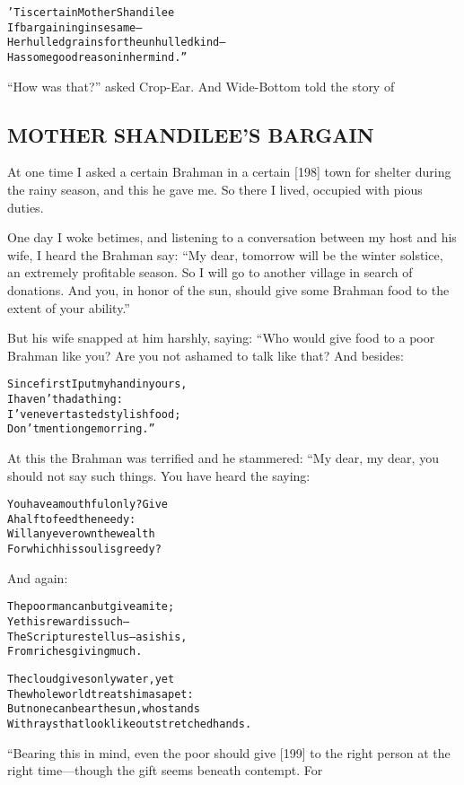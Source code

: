 \documentclass{article}
\renewenvironment{verbatim}{\begin{alltt}\normalfont\begin{centering}}{\end{centering}\end{alltt}}
\begin{document}
\begin{verbatim}
'Tis certain Mother Shandilee
If bargaining in sesame--
Her hulled grains for the unhulled kind--
Has some good reason in her mind.”
\end{verbatim}
``How was that?'' asked Crop-Ear. And Wide-Bottom told the story
of

\subsection{MOTHER SHANDILEE'S BARGAIN}

At one time I asked a certain Brahman in a certain [198] town for
shelter during the rainy season, and this he gave me. So there I
lived, occupied with pious duties.

One day I woke betimes, and listening to a conversation between my
host and his wife, I heard the Brahman say:
``My dear, tomorrow will be the winter solstice, an extremely profitable season. So I will go to another village in search of donations. And you, in honor of the sun, should give some Brahman food to the extent of your ability.''

But his wife snapped at him harshly, saying: “Who would give food
to a poor Brahman like you? Are you not ashamed to talk like that?
And besides:

\begin{verbatim}
Since first I put my hand in yours,
    I haven't had a thing:
I've never tasted stylish food;
    Don't mention gem or ring.”
\end{verbatim}
At this the Brahman was terrified and he stammered: “My dear, my
dear, you should not say such things. You have heard the saying:

\begin{verbatim}
You have a mouthful only? Give
    A half to feed the needy:
Will any ever own the wealth
    For which his soul is greedy?
\end{verbatim}
And again:

\begin{verbatim}
The poor man can but give a mite;
    Yet his reward is such--
The Scriptures tell us--as is his,
    From riches giving much.

The cloud gives only water, yet
The whole world treats him as a pet:
But none can bear the sun, who stands
With rays that look like outstretched hands.
\end{verbatim}
“Bearing this in mind, even the poor should give [199] to the right
person at the right time---though the gift seems beneath contempt.
For
\end{document}
